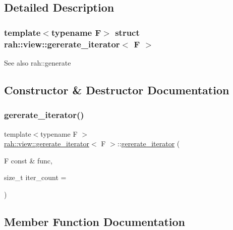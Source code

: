 \subsection{Detailed Description}
\subsubsection*{template$<$typename F$>$\newline
struct rah\+::view\+::gererate\+\_\+iterator$<$ F $>$}

\begin{DoxySeeAlso}{See also}
rah\+::generate 
\end{DoxySeeAlso}


\subsection{Constructor \& Destructor Documentation}
\mbox{\label{structrah_1_1view_1_1gererate__iterator_a4fc4cf21eac55d6ffde930c781200256}} 
\subsubsection{\texorpdfstring{gererate\_iterator()}{gererate\_iterator()}}
{\footnotesize\ttfamily template$<$typename F $>$ \\
\mbox{\hyperlink{structrah_1_1view_1_1gererate__iterator}{rah\+::view\+::gererate\+\_\+iterator}}$<$ F $>$\+::\mbox{\hyperlink{structrah_1_1view_1_1gererate__iterator}{gererate\+\_\+iterator}} (\begin{DoxyParamCaption}\item[{F const \&}]{func,  }\item[{size\+\_\+t}]{iter\+\_\+count = {} }\end{DoxyParamCaption})\hspace{0.3cm}{\ttfamily [inline]}}



\subsection{Member Function Documentation}
\mbox{\label{structrah_1_1view_1_1gererate__iterator_abc6f805627089f90408143d73d2f4227}} 
